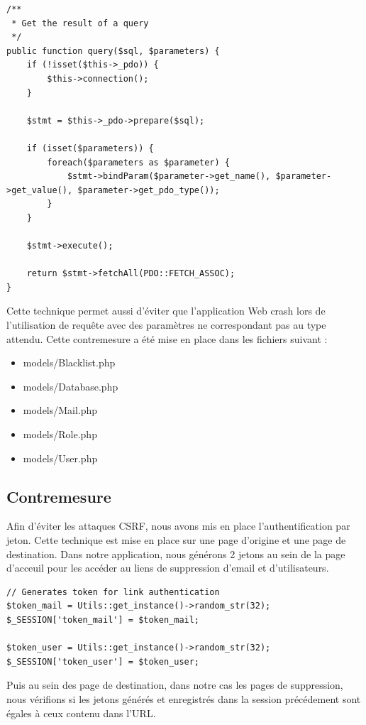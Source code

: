 \documentclass[12pt]{article}
\begin{document}
\begin{lstlisting}[style=JAVA]
/**
 * Get the result of a query
 */
public function query($sql, $parameters) {
    if (!isset($this->_pdo)) {
        $this->connection();
    }

    $stmt = $this->_pdo->prepare($sql);
    
    if (isset($parameters)) {
        foreach($parameters as $parameter) {
            $stmt->bindParam($parameter->get_name(), $parameter->get_value(), $parameter->get_pdo_type());
        }
    }

    $stmt->execute();

    return $stmt->fetchAll(PDO::FETCH_ASSOC);
}
\end{lstlisting}

Cette technique permet aussi d'éviter que l'application Web crash lors de l'utilisation de requête avec des paramètres ne correspondant pas au type attendu.
Cette contremesure a été mise en place dans les fichiers suivant :

\begin{itemize}
\item models/Blacklist.php
\item models/Database.php
\item models/Mail.php
\item models/Role.php
\item models/User.php
\end{itemize}

\subsection{Contremesure}\label{c4}

Afin d'éviter les attaques CSRF, nous avons mis en place l'authentification par jeton. Cette technique est mise en place sur une page d'origine et une page de destination.
Dans notre application, nous générons 2 jetons au sein de la page d'acceuil pour les accéder au liens de suppression d'email et d'utilisateurs.

\begin{lstlisting}[style=JAVA]
// Generates token for link authentication
$token_mail = Utils::get_instance()->random_str(32);
$_SESSION['token_mail'] = $token_mail;

$token_user = Utils::get_instance()->random_str(32);
$_SESSION['token_user'] = $token_user;
\end{lstlisting}

Puis au sein des page de destination, dans notre cas les pages de suppression, nous vérifions si les jetons générés et enregistrés dans la session précédement sont égales à ceux contenu dans l'URL.
\end{document}
